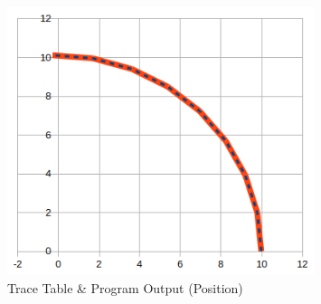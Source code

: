 \begin{figure}[h]
  \centering
  \includegraphics[width=0.8\textwidth]{img/testingEvidence/tracetable.png}
  \caption{Trace Table \& Program Output (Position)}
\end{figure}

